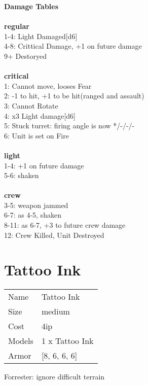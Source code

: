 {\bf Damage Tables} \\
\ \\ {\bf regular } \\
1-4: Light Damaged[d6] \\
4-8: Crittical Damage, +1 on future damage \\
9+ Destoryed \\
\ \\ {\bf critical } \\
1: Cannot move, looses Fear \\
2: -1 to hit, +1 to be hit(ranged and assault) \\
3: Cannot Rotate \\
4: x3 Light damage[d6] \\
5: Stuck turret: firing angle is now */-/-/- \\
6: Unit is set on Fire \\
\ \\ {\bf light } \\
1-4: +1 on future damage \\
5-6: shaken \\
\ \\ {\bf crew } \\
3-5: weapon jammed \\
6-7: as 4-5, shaken \\
8-11: as 6-7, +3 to future crew damage \\
12: Crew Killed, Unit Destroyed \\










\pagebreak\pagebreak

\section{ Tattoo Ink }

\begin{tabular}{ll}
  Name & Tattoo Ink \\
  Size & medium\\
  Cost & 4ip\\
  Models & 1 x Tattoo Ink\\
  Armor & [8, 6, 6, 6]\\
\end{tabular}

\noindent Forrester: ignore difficult terrain\\ 


